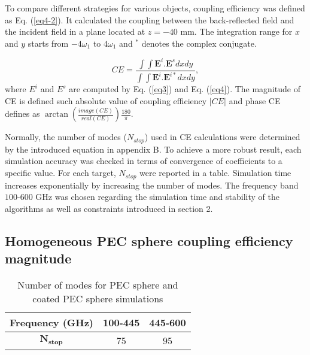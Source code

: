 \documentclass{osa-article}
\begin{document}
To compare different strategies for various objects, coupling efficiency was defined as Eq. (\ref{eq4-2}). It calculated the coupling between the back-reflected field and the incident field in a plane located at $z=-40$ mm. The integration range for $x$ and $y$ starts from $-4\omega_1$ to $4\omega_1$ and $^*$ denotes the complex conjugate.

\begin{equation}\label{eq4-2}
CE=\frac{\int\int\mathbf{E}^{i}.\mathbf{E}^sdxdy}{\int\int\mathbf{E}^i.\mathbf{E}^{i*}dxdy},
\end{equation}
where $E^{i}$ and $E^{s}$ are computed by Eq. (\ref{eq3}) and Eq. (\ref{eq4}). The magnitude of CE is defined such absolute value of coupling efficiency $|CE|$ and phase CE defines as $\arctan(\frac{image(CE)}{real(CE)})\frac{180}{\pi}$.

Normally, the number of modes ($N_{stop}$) used in CE calculations were determined by the introduced equation in appendix B. To achieve a more robust result, each simulation accuracy was checked in terms of convergence of coefficients to a specific value. For each target, $N_{stop}$ were reported in a table. Simulation time increases exponentially by increasing the number of modes. The frequency band $100$-$600$ GHz was chosen regarding the simulation time and stability of the algorithms as well as constraints introduced in section 2.

\subsection{Homogeneous PEC sphere coupling efficiency magnitude}
\begin{table}[h]
\centering
\caption{Number of modes for PEC sphere and coated PEC sphere simulations}\label{t1}
\begin{tabular}{ c | c  c }
\hline
\textbf{Frequency (GHz)} & 100-445 & 445-600 \\ 
\hline
$\mathbf{N_{stop}}$ & 75 & 95 \\ [0.5ex] 
\hline
\end{tabular}
\end{table}
\end{document}
